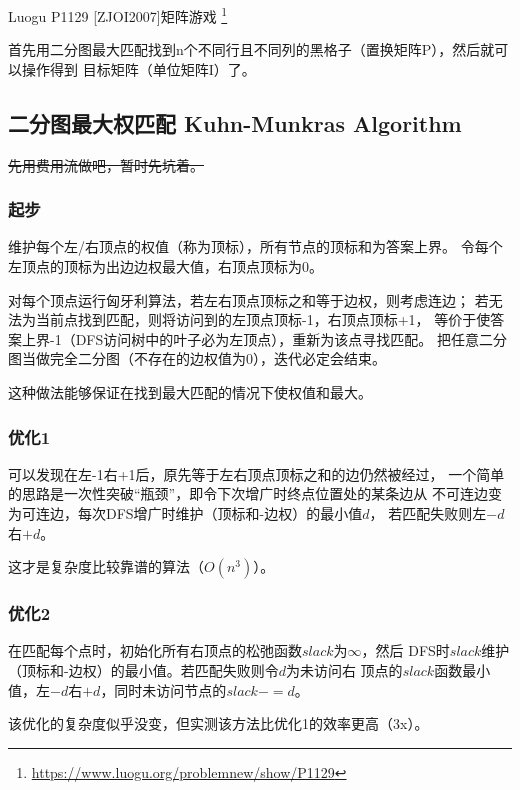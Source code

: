 Luogu P1129 [ZJOI2007]矩阵游戏
\footnote{\url{https://www.luogu.org/problemnew/show/P1129}}

首先用二分图最大匹配找到n个不同行且不同列的黑格子（置换矩阵P），然后就可以操作得到
目标矩阵（单位矩阵I）了。



\subsection{二分图最大权匹配 Kuhn-Munkras Algorithm}
\sout{先用费用流做吧，暂时先坑着。}
\subsubsection{起步}
维护每个左/右顶点的权值（称为顶标），所有节点的顶标和为答案上界。
令每个左顶点的顶标为出边边权最大值，右顶点顶标为0。

对每个顶点运行匈牙利算法，若左右顶点顶标之和等于边权，则考虑连边；
若无法为当前点找到匹配，则将访问到的左顶点顶标-1，右顶点顶标+1，
等价于使答案上界-1（DFS访问树中的叶子必为左顶点），重新为该点寻找匹配。
把任意二分图当做完全二分图（不存在的边权值为0），迭代必定会结束。

这种做法能够保证在找到最大匹配的情况下使权值和最大。
\subsubsection{优化1}
可以发现在左-1右+1后，原先等于左右顶点顶标之和的边仍然被经过，
一个简单的思路是一次性突破``瓶颈''，即令下次增广时终点位置处的某条边从
不可连边变为可连边，每次DFS增广时维护（顶标和-边权）的最小值$d$，
若匹配失败则左$-d$右$+d$。

这才是复杂度比较靠谱的算法（$O(n^3)$）。
\subsubsection{优化2}
在匹配每个点时，初始化所有右顶点的松弛函数$slack$为$\infty$，然后
DFS时$slack$维护（顶标和-边权）的最小值。若匹配失败则令$d$为未访问右
顶点的$slack$函数最小值，左$-d$右$+d$，同时未访问节点的$slack-=d$。

该优化的复杂度似乎没变，但实测该方法比优化1的效率更高（3x）。

